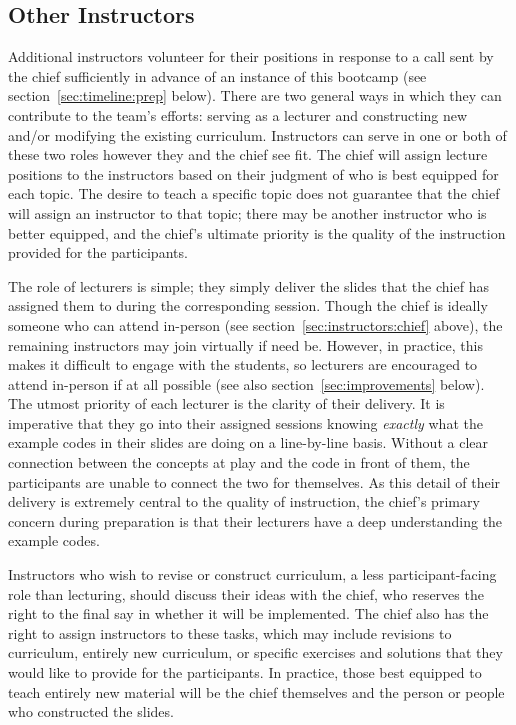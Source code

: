 \subsection{Other Instructors}
\label{sec:instructors:others}
\noindent
Additional instructors volunteer for their positions in response to a call sent
by the chief sufficiently in advance of an instance of this bootcamp (see
section~\ref{sec:timeline:prep} below).
There are two general ways in which they can contribute to the team's efforts:
serving as a lecturer and constructing new and/or modifying the existing
curriculum.
Instructors can serve in one or both of these two roles however they and the
chief see fit.
The chief will assign lecture positions to the instructors based on their
judgment of who is best equipped for each topic.
The desire to teach a specific topic does not guarantee that the chief will
assign an instructor to that topic; there may be another instructor who is
better equipped, and the chief's ultimate priority is the quality of the
instruction provided for the participants.
\par
The role of lecturers is simple; they simply deliver the slides that the chief
has assigned them to during the corresponding session.
Though the chief is ideally someone who can attend in-person (see
section~\ref{sec:instructors:chief} above), the remaining instructors may join
virtually if need be.
However, in practice, this makes it difficult to engage with the students, so
lecturers are encouraged to attend in-person if at all possible (see also
section~\ref{sec:improvements} below).
The utmost priority of each lecturer is the clarity of their delivery.
It is imperative that they go into their assigned sessions knowing
\textit{exactly} what the example codes in their slides are doing on a
line-by-line basis.
Without a clear connection between the concepts at play and the code in front
of them, the participants are unable to connect the two for themselves.
As this detail of their delivery is extremely central to the quality of
instruction, the chief's primary concern during preparation is that their
lecturers have a deep understanding the example codes.
\par
Instructors who wish to revise or construct curriculum, a less
participant-facing role than lecturing, should discuss their ideas with the
chief, who reserves the right to the final say in whether it will be
implemented.
The chief also has the right to assign instructors to these tasks, which may
include revisions to curriculum, entirely new curriculum, or specific exercises
and solutions that they would like to provide for the participants.
In practice, those best equipped to teach entirely new material will be the
chief themselves and the person or people who constructed the slides.





